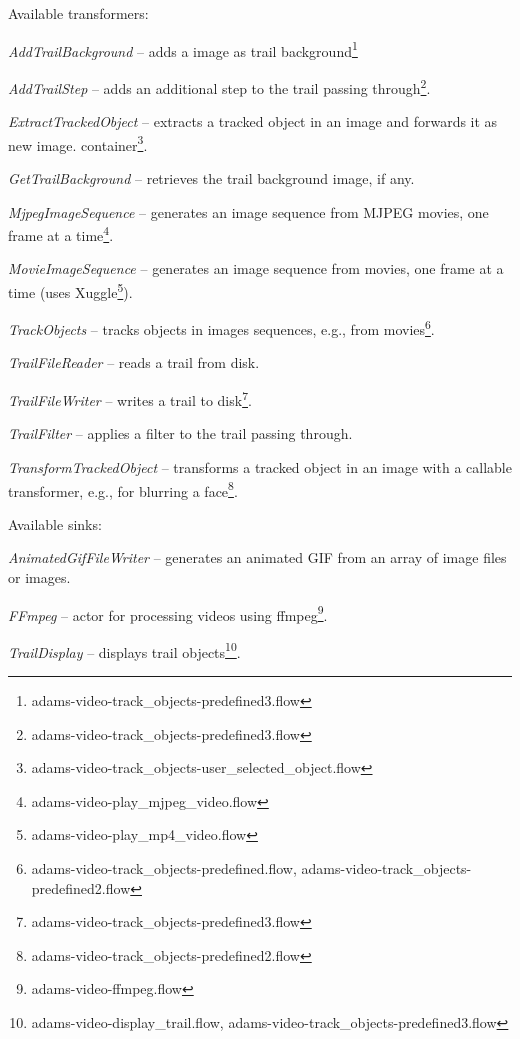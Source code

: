 \documentclass[a4paper]{book}
\begin{document}
\noindent Available transformers:
\begin{tight_itemize}
	\item \textit{AddTrailBackground} -- adds a image as trail
	background\footnote{adams-video-track\_objects-predefined3.flow}
	\item \textit{AddTrailStep} -- adds an additional step to the trail
	passing through\footnote{adams-video-track\_objects-predefined3.flow}.
	\item \textit{ExtractTrackedObject} -- extracts a tracked
	object in an image and forwards it as new image.
	container\footnote{adams-video-track\_objects-user\_selected\_object.flow}.
	\item \textit{GetTrailBackground} -- retrieves the trail background image, if any.
	\item \textit{MjpegImageSequence} -- generates an image sequence
	from MJPEG movies, one frame at a time\footnote{adams-video-play\_mjpeg\_video.flow}.
	\item \textit{MovieImageSequence} -- generates an image sequence
	from movies, one frame at a time (uses Xuggle\cite{xuggle}\footnote{adams-video-play\_mp4\_video.flow}).
	\item \textit{TrackObjects} -- tracks objects in images sequences,
	e.g., from movies\footnote{adams-video-track\_objects-predefined.flow, adams-video-track\_objects-predefined2.flow}.
	\item \textit{TrailFileReader} -- reads a trail from disk.
	\item \textit{TrailFileWriter} -- writes a trail to disk\footnote{adams-video-track\_objects-predefined3.flow}.
	\item \textit{TrailFilter} -- applies a filter to the trail passing through.
	\item \textit{TransformTrackedObject} -- transforms a tracked
	object in an image with a callable transformer, e.g., for blurring a
	face\footnote{adams-video-track\_objects-predefined2.flow}.
\end{tight_itemize}

\noindent Available sinks:
\begin{tight_itemize}
  \item \textit{AnimatedGifFileWriter} -- generates an animated GIF from
  an array of image files or images.
  \item \textit{FFmpeg} -- actor for processing videos using
  ffmpeg\cite{ffmpeg}\footnote{adams-video-ffmpeg.flow}.
  \item \textit{TrailDisplay} -- displays trail objects\footnote{adams-video-display\_trail.flow, adams-video-track\_objects-predefined3.flow}.
\end{tight_itemize}
\end{document}
